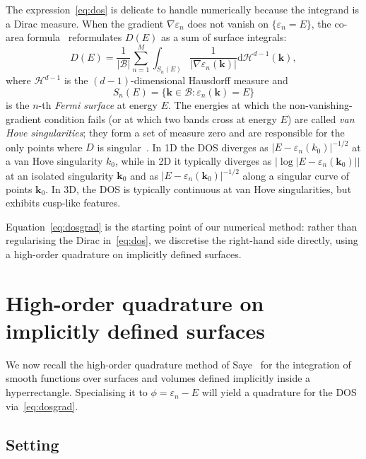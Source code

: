\documentclass[11pt]{article}
\numberwithin{equation}{section}
\begin{document}
The expression~\eqref{eq:dos} is delicate to handle numerically because the integrand is a
Dirac measure. When the gradient \(\nabla \varepsilon_n\) does not vanish on
\(\{\varepsilon_n = E\}\), the co-area formula~\cite{cances2020numerical} reformulates
\(D(E)\) as a sum of surface integrals:
\begin{equation}
    D(E) = \frac{1}{|\mathcal{B}|} \sum_{n=1}^M
    \int_{S_n(E)} \frac{1}{|\nabla \varepsilon_n(\mathbf{k})|}
    \mathrm{d}\mathcal{H}^{d-1}(\mathbf{k}),
    \label{eq:dosgrad}
\end{equation}
where \(\mathcal{H}^{d-1}\) is the \((d-1)\)-dimensional Hausdorff measure and
\begin{equation}
    S_n(E) = \{\mathbf{k} \in \mathcal{B} : \varepsilon_n(\mathbf{k}) = E\}
\end{equation}
is the \(n\)-th \emph{Fermi surface} at energy \(E\). The energies at which the
non-vanishing-gradient condition fails (or at which two bands cross at energy \(E\)) are
called \emph{van Hove singularities}; they form a set of measure zero and are responsible
for the only points where \(D\) is singular~\cite{vanhove1953occurrence}. In 1D the DOS
diverges as \(|E - \varepsilon_n(k_0)|^{-1/2}\) at a van Hove singularity \(k_0\), while
in 2D it typically diverges as \(|\log|E - \varepsilon_n(\mathbf{k}_0)||\) at an isolated
singularity \(\mathbf{k}_0\) and as \(|E - \varepsilon_n(\mathbf{k}_0)|^{-1/2}\) along a
singular curve of points \(\mathbf{k}_0\). In 3D, the DOS is typically continuous at van
Hove singularities, but exhibits cusp-like features.

Equation~\eqref{eq:dosgrad} is the starting point of our numerical method: rather than
regularising the Dirac in~\eqref{eq:dos}, we discretise the right-hand side directly,
using a high-order quadrature on implicitly defined surfaces.

\section{High-order quadrature on implicitly defined surfaces}\label{sec:saye}

We now recall the high-order quadrature method of Saye~\cite{saye2015highorder} for the
integration of smooth functions over surfaces and volumes defined implicitly inside a
hyperrectangle. Specialising it to \(\phi = \varepsilon_n - E\) will yield a quadrature
for the DOS via~\eqref{eq:dosgrad}.

\subsection{Setting}
\end{document}
